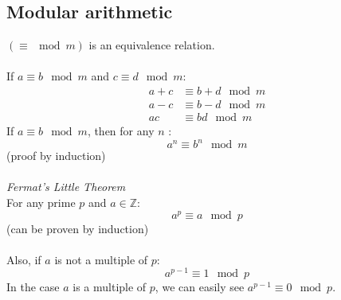 \documentclass{scrartcl}
\newcommand{\Z}{\mathbb{Z}}
\begin{document}
\subsection{Modular arithmetic}
$ (\equiv \mod m) $ is an equivalence relation.
\\\\
If $ a \equiv b \mod m $ and $ c \equiv d \mod m $:
\begin{align}
a + c & \equiv b + d \mod m \\
a - c & \equiv b - d \mod m \\
ac & \equiv bd \mod m
\end{align}
If $ a \equiv b \mod m $, then for any $ n $ :
\begin{equation}
a^{n} \equiv b^{n} \mod m
\end{equation}
(proof by induction)
\\\\
\textit{Fermat's Little Theorem}
\\
For any prime $ p $ and $ a \in \Z $:
\begin{equation}
a^{p} \equiv a \mod p
\end{equation}
(can be proven by induction)
\\\\
Also, if $ a $ is not a multiple of $ p $:
\begin{equation}
a^{p-1} \equiv 1 \mod p
\end{equation}
In the case $ a $ is a multiple of $ p $, we can easily see $ a^{p-1} \equiv 0 \mod p $.
\end{document}
